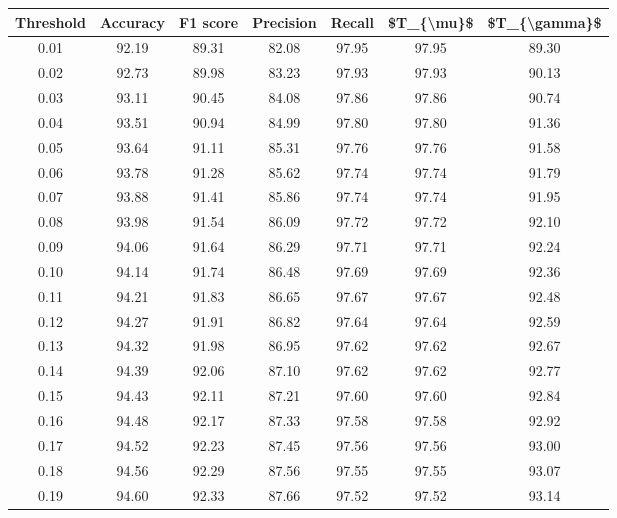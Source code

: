 \begin{tabular}{|c|c|c|c|c|c|c|}
\hline
 Threshold &  Accuracy &  F1 score &  Precision &  Recall &  \$T\_\{\textbackslash mu\}\$ &  \$T\_\{\textbackslash gamma\}\$ \\
\hline
      0.01 &     92.19 &     89.31 &      82.08 &   97.95 &      97.95 &         89.30 \\
      0.02 &     92.73 &     89.98 &      83.23 &   97.93 &      97.93 &         90.13 \\
      0.03 &     93.11 &     90.45 &      84.08 &   97.86 &      97.86 &         90.74 \\
      0.04 &     93.51 &     90.94 &      84.99 &   97.80 &      97.80 &         91.36 \\
      0.05 &     93.64 &     91.11 &      85.31 &   97.76 &      97.76 &         91.58 \\
      0.06 &     93.78 &     91.28 &      85.62 &   97.74 &      97.74 &         91.79 \\
      0.07 &     93.88 &     91.41 &      85.86 &   97.74 &      97.74 &         91.95 \\
      0.08 &     93.98 &     91.54 &      86.09 &   97.72 &      97.72 &         92.10 \\
      0.09 &     94.06 &     91.64 &      86.29 &   97.71 &      97.71 &         92.24 \\
      0.10 &     94.14 &     91.74 &      86.48 &   97.69 &      97.69 &         92.36 \\
      0.11 &     94.21 &     91.83 &      86.65 &   97.67 &      97.67 &         92.48 \\
      0.12 &     94.27 &     91.91 &      86.82 &   97.64 &      97.64 &         92.59 \\
      0.13 &     94.32 &     91.98 &      86.95 &   97.62 &      97.62 &         92.67 \\
      0.14 &     94.39 &     92.06 &      87.10 &   97.62 &      97.62 &         92.77 \\
      0.15 &     94.43 &     92.11 &      87.21 &   97.60 &      97.60 &         92.84 \\
      0.16 &     94.48 &     92.17 &      87.33 &   97.58 &      97.58 &         92.92 \\
      0.17 &     94.52 &     92.23 &      87.45 &   97.56 &      97.56 &         93.00 \\
      0.18 &     94.56 &     92.29 &      87.56 &   97.55 &      97.55 &         93.07 \\
      0.19 &     94.60 &     92.33 &      87.66 &   97.52 &      97.52 &         93.14 \\

\end{tabular}
